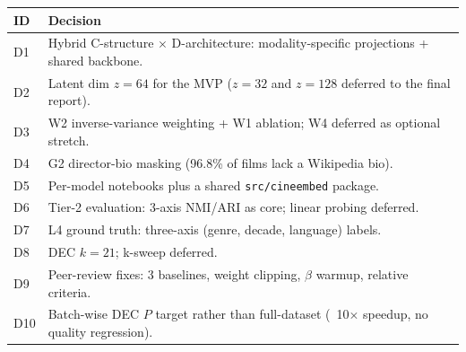 \documentclass[11pt,a4paper]{article}
\begin{document}
\begin{center}\small
{}
\begin{tabular}{@{}l p{11cm}@{}}
\toprule
\textbf{ID} & \textbf{Decision} \\
\midrule
D1  & Hybrid C-structure $\times$ D-architecture: modality-specific projections + shared backbone. \\
D2  & Latent dim $z=64$ for the MVP ($z=32$ and $z=128$ deferred to the final report). \\
D3  & W2 inverse-variance weighting + W1 ablation; W4 deferred as optional stretch. \\
D4  & G2 director-bio masking (96.8\% of films lack a Wikipedia bio). \\
D5  & Per-model notebooks plus a shared \texttt{src/cineembed} package. \\
D6  & Tier-2 evaluation: 3-axis NMI/ARI as core; linear probing deferred. \\
D7  & L4 ground truth: three-axis (genre, decade, language) labels. \\
D8  & DEC $k=21$; k-sweep deferred. \\
D9  & Peer-review fixes: 3 baselines, weight clipping, $\beta$ warmup, relative criteria. \\
D10 & Batch-wise DEC $P$ target rather than full-dataset (~10$\times$ speedup, no quality regression). \\
\bottomrule
\end{tabular}
\end{center}

\printbibliography[heading=bibintoc, title={References}]
\end{document}
